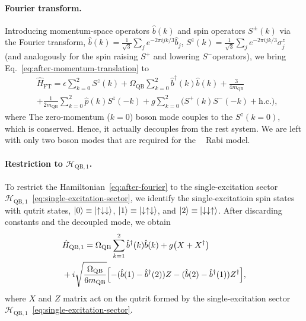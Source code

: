 \documentclass[reprint, aps, prx, amsmath, amssymb, longbibliography, superscriptaddress]{revtex4-2}
\DeclareMathOperator{\Zthree}{\mathbb{Z}_3}
\begin{document}
\paragraph{Fourier transform.}
Introducing momentum-space operators $\hat b(k)$ and spin operators $S^{\pm}(k)$ via the Fourier transform, $\hat b(k)= \tfrac{1}{\sqrt{3}}\sum_{j}e^{-2\pi i jk/3}\hat b_j$, $ S^z(k)= \tfrac{1}{\sqrt{3}}\sum_{j}e^{-2\pi i jk/3}\sigma_j^z$ (and analogously for the spin raising $S^+$ and lowering $S^-$operators), we
bring Eq.~\eqref{eq:after-momentum-translation} to
\begin{equation}
\label{eq:after-fourier}
  \begin{aligned}
    &\hat H_{\text{FT}} = \epsilon \sum_{k=0}^{2} S^{z}(k)
      + \Omega_{\text{QB}} \sum_{k=0}^{2} \hat b^{\dagger}(k) \hat b(k)
                         + \frac{3}{4 m_{\text{QB}}} \\
     &+\frac{1}{2 m_{\text{QB}}} \sum_{k=0}^{2} \hat p(k) S^{z}(-k)
            + g \sum_{k=0}^{2} \bigl( S^{+}(k) S^{-}(-k) + \text{h.c.} \bigr),
  \end{aligned}
\end{equation}
where The zero-momentum ($k=0$) boson mode
couples to the $S^z(k=0)$, which is conserved. Hence, it actually decouples from the rest system. We are left with only two boson modes that are required for the $\Zthree$ Rabi model.

\paragraph{Restriction to $\mathcal H_{\text{QB},1}$.}
To restrict the Hamiltonian~\eqref{eq:after-fourier} to the single-excitation sector $\mathcal{H}_{\text{QB},1}$~\eqref{eq:single-excitation-sector}, we identify the single-excitatioin spin states with qutrit states, $\ket{0} \equiv \ket{\uparrow\downarrow\downarrow}$, $ \ket{1} \equiv \ket{\downarrow\uparrow\downarrow}$, and $ \ket{2} \equiv \ket{\downarrow\downarrow\uparrow} $. After discarding constants and the decoupled mode, we obtain
\begin{equation}
  \begin{aligned}
    &\hat H_{\text{QB},1} = \Omega_{\text{QB}} \sum_{k=1}^{2} \hat b^{\dagger}(k)
      \hat b(k) + g \bigl( X + X^{\dagger} \bigr)
      \\
      &+ i \sqrt{ \frac{\Omega_{\text{QB}}}{6 m_{\text{QB}}} }
        \Bigl[ -( \hat b(1) - \hat b^{\dagger}(2) ) Z
        - ( \hat b(2) - \hat b^{\dagger}(1) ) Z^{\dagger} \Bigr],
  \end{aligned}
\end{equation}
where $X$ and $Z$ matrix act on the qutrit formed by the single-excitation sector $\mathcal{H}_{\text{QB},1}$~\eqref{eq:single-excitation-sector}.
\end{document}
